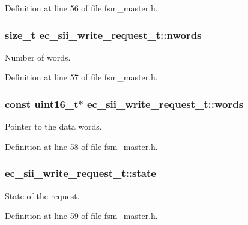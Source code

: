 Definition at line 56 of file fsm\-\_\-master.\-h.

\subsubsection[{nwords}]{\setlength{\rightskip}{0pt plus 5cm}size\-\_\-t ec\-\_\-sii\-\_\-write\-\_\-request\-\_\-t\-::nwords}\label{structec__sii__write__request__t_a98d3bd46058ea045c94f6f32d0b01d62}


Number of words. 



Definition at line 57 of file fsm\-\_\-master.\-h.

\subsubsection[{words}]{\setlength{\rightskip}{0pt plus 5cm}const uint16\-\_\-t$\ast$ ec\-\_\-sii\-\_\-write\-\_\-request\-\_\-t\-::words}\label{structec__sii__write__request__t_a8a435488d56415ece3c1c531bf9712bf}


Pointer to the data words. 



Definition at line 58 of file fsm\-\_\-master.\-h.

\subsubsection[{state}]{ ec\-\_\-sii\-\_\-write\-\_\-request\-\_\-t\-::state}\label{structec__sii__write__request__t_a4751ad577cec3bff18f540147a8e7ca0}


State of the request. 



Definition at line 59 of file fsm\-\_\-master.\-h.

